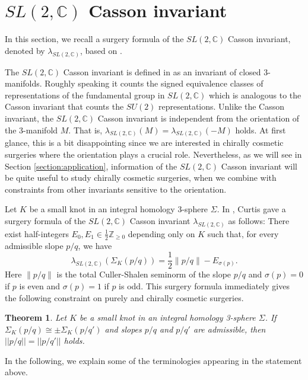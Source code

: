 \documentclass{amsart}
\newtheorem{theorem}{Theorem}[section]
\theoremstyle{remark}
\theoremstyle{definition}
\begin{document}
\section{$SL(2,\mathbb{C})$ Casson invariant }\label{sec:SL(2,C)Casson}

In this section, we recall a surgery formula of the $SL(2,\mathbb{C})$ Casson invariant, denoted by $\lambda_{SL(2,\mathbb{C})}$, based on \cite{BodenCurtis}. 

The $SL(2,\mathbb{C})$ Casson invariant is defined in \cite{Curtis} as an invariant of closed 3-manifolds. 
Roughly speaking it counts the signed equivalence classes of representations of the fundamental group in $SL(2,\mathbb{C})$ which is analogous to the Casson invariant that counts the $SU(2)$ representations.
Unlike the Casson invariant,  the $SL(2,\mathbb{C})$ Casson invariant is independent from the orientation of the 3-manifold $M$. 
That is, $\lambda_{SL(2,\mathbb{C})}(M)=\lambda_{SL(2,\mathbb{C})}(-M)$ holds.
At first glance, this is a bit disappointing since we are interested in chirally cosmetic surgeries where the orientation plays a crucial role. 
Nevertheless, as we will see in Section \ref{section:application}, 
information of the $SL(2,\mathbb{C})$ Casson invariant will be quite useful to study chirally cosmetic surgeries, 
when we combine with constraints from other invariants sensitive to the orientation.

Let $K$ be a small knot in an integral homology 3-sphere $\Sigma$. 
In \cite{Curtis}, Curtis gave a surgery formula of the $SL(2,\mathbb{C})$ Casson invariant $\lambda_{SL(2,\mathbb{C})}$ as follows: 
There exist half-integers $E_0, E_1 \in \frac{1}{2} \mathbb{Z}_{\ge 0}$ 
depending only on $K$ such that, for every admissible slope $p/q$, we have
$$
\lambda_{SL(2,\mathbb{C})} ( \Sigma_{K} (p/q) ) 
= \frac{1}{2} \left\| p / q \right\| - E_{\sigma(p)}.
$$
Here $\left\| p / q \right\| $ is the total Culler-Shalen seminorm of the slope $p/q$ 
and $\sigma (p) =0$ if $p$ is even and $\sigma (p)=1$ if $p$ is odd.
This surgery formula immediately gives the following constraint on  purely and chirally cosmetic surgeries.

\begin{theorem}
\label{theorem:SL2Ccasson-1}
Let $K$ be a small knot in an integral homology 3-sphere $\Sigma$. 
If $\Sigma_K (p/q)\cong \pm \Sigma_K (p/q')$ and slopes $p/q$ and $p/q'$ are admissible, then $|| p/q||=||p/q'||$ holds.
\end{theorem}

In the following, we explain some of the terminologies appearing in the statement above. 
\end{document}
